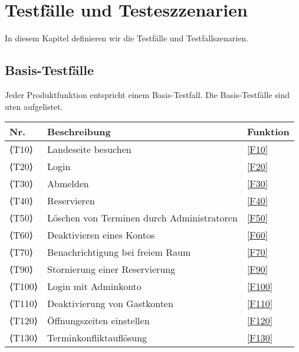 \chapter{Testfälle und Testeszzenarien}
\label{chap:test}
In diesem Kapitel definieren wir die Testfälle und Testfallszenarien.

\section{Basis-Testfälle}

Jeder Produktfunktion entspricht einem Basis-Testfall. Die Basis-Testfälle sind uten aufgelistet.


\begin{table}[htbp]

  \centering
  \begin{tabularx}{\textwidth}{ l|X|l }
      \textbf{Nr.} & \textbf{Beschreibung} & \textbf{Funktion} \\ \hline\hline
      ⟨T10⟩ & Landeseite besuchen &\ref{F10}\\
      ⟨T20⟩ & Login &\ref{F20} \\
      ⟨T30⟩ & Abmelden &\ref{F30} \\
      ⟨T40⟩ & Reservieren &\ref{F40} \\
      ⟨T50⟩ & Löschen von Terminen durch Administratoren &\ref{F50} \\
      ⟨T60⟩ & Deaktivieren eines Kontos &\ref{F60} \\
      ⟨T70⟩ & Benachrichtigung bei freiem Raum &\ref{F70} \\
      ⟨T90⟩ & Stornierung einer Reservierung &\ref{F90} \\
      ⟨T100⟩& Login mit Adminkonto &\ref{F100} \\
      ⟨T110⟩ & Deaktivierung von Gastkonten &\ref{F110} \\
      ⟨T120⟩& Öffnungszeiten einstellen &\ref{F120} \\
      ⟨T130⟩& Terminkonfliktauflösung &\ref{F130} \\
  \end{tabularx}\label{tab:test_table}
\end{table}

\pagebreak

